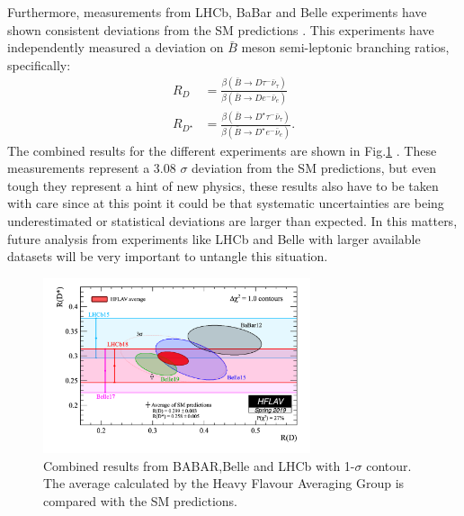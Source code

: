 Furthermore, measurements from LHCb, BaBar and Belle experiments have shown consistent deviations from the SM predictions \cite{Ciezarek_2017}. This experiments have independently measured a deviation on $\bar{B}$ meson semi-leptonic branching ratios, specifically:
\begin{align}
	R_D&=\frac{\beta(\bar{B}\to D\tau^-\bar{\nu}_\tau)}{\beta(\bar{B}\to De^-\bar{\nu}_e)}
	\\
	R_{D^\star}&=\frac{\beta(\bar{B}\to D^\star\tau^-\bar{\nu}_\tau)}{\beta(\bar{B}\to D^\star e^-\bar{\nu}_e)}.
\end{align}
The combined results for the different experiments are shown in Fig.\ref{Fig3} . These measurements represent a 3.08 $\sigma$
 deviation from the SM predictions, but even tough they represent a hint of new physics, these results also have to be taken with care since at this point it could be that systematic uncertainties are being underestimated or statistical deviations are larger than expected. In this matters, future analysis from experiments like LHCb and Belle with larger available datasets will be very important to untangle this situation.
 \begin{figure}[h]
 	\centering
 	\includegraphics[width=0.7\textwidth]{figures/Fig3}
 	\caption{Combined results from BABAR,Belle and LHCb with 1-$\sigma$ contour. The average calculated by the Heavy Flavour Averaging Group \cite{HFAG}  is compared with the SM predictions.}
 	\label{Fig3}
 \end{figure}